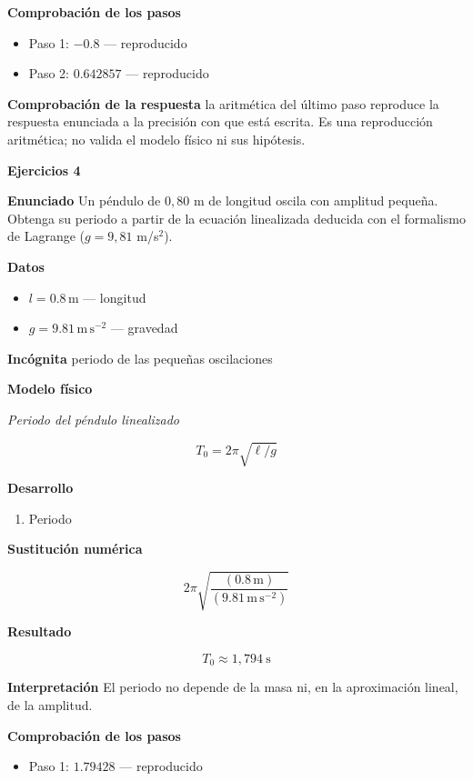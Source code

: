\documentclass[10pt,openany]{book}
\begin{document}
\noindent\textbf{Comprobación de los pasos}
\begin{itemize}
\item Paso 1: $-0.8$ — reproducido
\item Paso 2: $0.642857$ — reproducido
\end{itemize}

\noindent\textbf{Comprobación de la respuesta} la aritmética del último paso reproduce la respuesta enunciada a la precisión con que está escrita. Es una reproducción aritmética; no valida el modelo físico ni sus hipótesis.

\noindent\textbf{Ejercicios 4}

\noindent\textbf{Enunciado}
Un péndulo de \(0{,}80\) m de longitud oscila con amplitud pequeña. Obtenga su periodo a partir de la ecuación linealizada deducida con el formalismo de Lagrange (\(g = 9{,}81\) m/s\(^2\)).

\noindent\textbf{Datos}
\begin{itemize}
\item $l = 0.8\,\mathrm{m}$ — longitud
\item $g = 9.81\,\mathrm{m}\,\mathrm{s}^{-2}$ — gravedad
\end{itemize}

\noindent\textbf{Incógnita}
periodo de las pequeñas oscilaciones

\noindent\textbf{Modelo físico}

\noindent\textit{Periodo del péndulo linealizado}

\[
T_0 = 2\pi\sqrt{\ell/g}
\]

\noindent\textbf{Desarrollo}
\begin{enumerate}
\item
Periodo
\end{enumerate}

\noindent\textbf{Sustitución numérica}

\[
2 \pi \sqrt{\frac{\left(0.8\,\mathrm{m}\right)}{\left(9.81\,\mathrm{m}\,\mathrm{s}^{-2}\right)}}
\]

\noindent\textbf{Resultado}

\[
T_0 \approx 1{,}794\ \mathrm{s}
\]

\noindent\textbf{Interpretación}
El periodo no depende de la masa ni, en la aproximación lineal, de la amplitud.

\noindent\textbf{Comprobación de los pasos}
\begin{itemize}
\item Paso 1: $1.79428$ — reproducido
\end{itemize}
\end{document}
